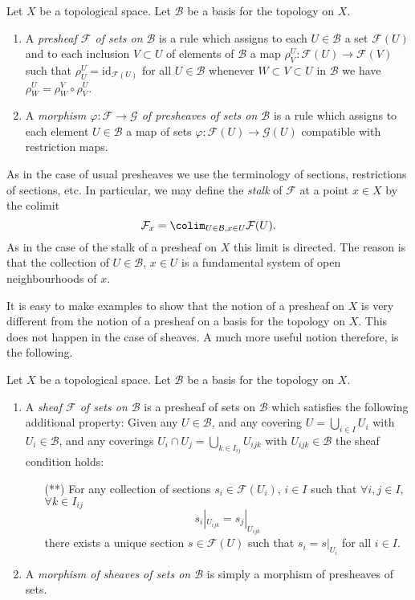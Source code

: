 \begin{definition}
\label{definition-presheaf-basis}
Let $X$ be a topological space. Let $\mathcal{B}$ be a
basis for the topology on $X$.
\begin{enumerate}
\item A {\it presheaf $\mathcal{F}$ of sets on $\mathcal{B}$}
is a rule which assigns to each $U \in \mathcal{B}$ a set
$\mathcal{F}(U)$ and to each inclusion $V \subset U$
of elements of $\mathcal{B}$ a map
$\rho^U_V : \mathcal{F}(U) \to \mathcal{F}(V)$ such that
$\rho^U_U = \text{id}_{\mathcal{F}(U)}$ for all $U \in \mathcal{B}$
whenever $W \subset V \subset U$ in $\mathcal{B}$ we have
$\rho^U_W = \rho^V_W \circ \rho ^U_V$.
\item A {\it morphism $\varphi : \mathcal{F} \to \mathcal{G}$
of presheaves of sets on $\mathcal{B}$} is a rule which assigns to each
element $U \in \mathcal{B}$ a map of sets $\varphi : \mathcal{F}(U)
\to \mathcal{G}(U)$ compatible with restriction maps.
\end{enumerate}
\end{definition}

\noindent
As in the case of usual presheaves we use the terminology of sections,
restrictions of sections, etc. In particular, we may define the
{\it stalk} of $\mathcal{F}$ at a point $x \in X$ by the
colimit
$$
\mathcal{F}_x = \colim_{U\in \mathcal{B}, x\in U} \mathcal{F}(U).
$$
As in the case of the stalk of a presheaf on $X$ this limit is
directed. The reason is that the collection of $U\in \mathcal{B}$,
$x \in U$ is a fundamental system of open neighbourhoods of $x$.

\medskip\noindent
It is easy to make examples to show that the notion of a presheaf
on $X$ is very different from the notion of a presheaf on a basis
for the topology on $X$. This does not happen in the case of
sheaves. A much more useful notion therefore, is the following.

\begin{definition}
\label{definition-sheaf-basis}
Let $X$ be a topological space. Let $\mathcal{B}$ be a
basis for the topology on $X$.
\begin{enumerate}
\item A {\it sheaf $\mathcal{F}$ of sets on $\mathcal{B}$} is a presheaf
of sets on $\mathcal{B}$ which satisfies the following additional
property: Given any $U \in \mathcal{B}$, and any covering
$U = \bigcup_{i \in I} U_i$ with $U_i \in \mathcal{B}$, and
any coverings $U_i \cap U_j = \bigcup_{k \in I_{ij}} U_{ijk}$ with
$U_{ijk} \in \mathcal{B}$ the sheaf condition holds:
\begin{itemize}
\item[(**)] For any collection
of sections $s_i \in \mathcal{F}(U_i)$, $i \in I$ such that
$\forall i, j\in I$, $\forall k\in I_{ij}$
$$
s_i|_{U_{ijk}} = s_j|_{U_{ijk}}
$$
there exists a unique section $s \in \mathcal{F}(U)$ such that
$s_i = s|_{U_i}$ for all $i \in I$.
\end{itemize}
\item A {\it morphism of sheaves of sets on $\mathcal{B}$} is simply a
morphism of presheaves of sets.
\end{enumerate}
\end{definition}

